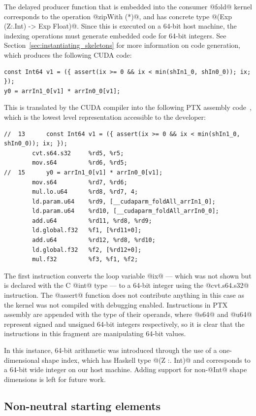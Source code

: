 The delayed producer function that is embedded into the consumer @fold@ kernel
corresponds to the operation @zipWith (*)@, and has concrete type
@(Exp (Z:.Int) -> Exp Float)@. Since this is executed on a 64-bit host machine,
the indexing operations must generate embedded code for 64-bit integers. See
Section~\ref{sec:instantiating_skeletons} for more information on code
generation, which produces the following CUDA code:
%
\begin{lstlisting}[style=haskell]
const Int64 v1 = ({ assert(ix >= 0 && ix < min(shIn1_0, shIn0_0)); ix; });
y0 = arrIn1_0[v1] * arrIn0_0[v1];
\end{lstlisting}
%
This is translated by the CUDA compiler into the following PTX assembly
code~\cite{NVIDIA:2012vj}, which is the lowest level representation accessible
to the developer:
%
\begin{lstlisting}[style=ptx]
//  13      const Int64 v1 = ({ assert(ix >= 0 && ix < min(shIn1_0, shIn0_0)); ix; });
        cvt.s64.s32     %rd5, %r5;
        mov.s64         %rd6, %rd5;
//  15      y0 = arrIn1_0[v1] * arrIn0_0[v1];
        mov.s64         %rd7, %rd6;
        mul.lo.u64      %rd8, %rd7, 4;
        ld.param.u64    %rd9, [__cudaparm_foldAll_arrIn1_0];
        ld.param.u64    %rd10, [__cudaparm_foldAll_arrIn0_0];
        add.u64         %rd11, %rd8, %rd9;
        ld.global.f32   %f1, [%rd11+0];
        add.u64         %rd12, %rd8, %rd10;
        ld.global.f32   %f2, [%rd12+0];
        mul.f32         %f3, %f1, %f2;
\end{lstlisting}
%
The first instruction converts the loop variable @ix@ --- which was not shown
but is declared with the C @int@ type --- to a 64-bit integer using the
@cvt.s64.s32@ instruction. The @assert@ function does not contribute anything in
this case as the kernel was not compiled with debugging enabled. Instructions in
PTX assembly are appended with the type of their operands, where @s64@ and @u64@
represent signed and unsigned 64-bit integers respectively, so it is clear that
the instructions in this fragment are manipulating 64-bit values.

In this instance, 64-bit arithmetic was introduced through the use of a
one-dimensional shape index, which has Haskell type @(Z :. Int)@ and corresponds
to a 64-bit wide integer on our host machine. Adding support for non-@Int@ shape
dimensions is left for future work.


\subsection{Non-neutral starting elements}
\label{sec:non-neutral_starting_elements}

